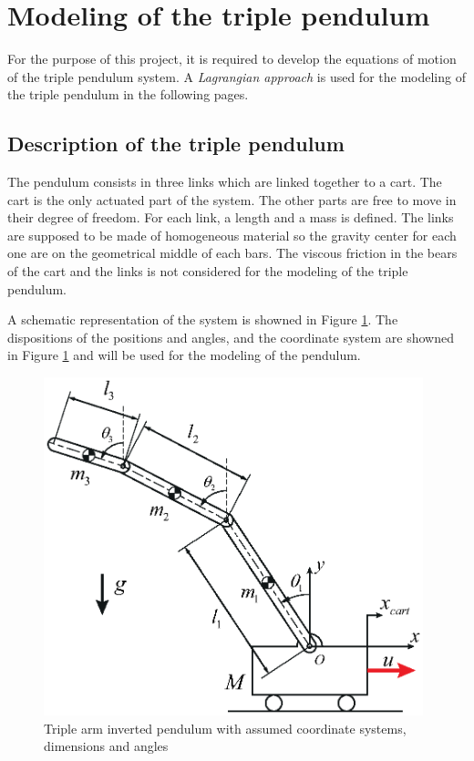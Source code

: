 \documentclass[a4paper,12pt,twoside]{article}
\begin{document}
\section{Modeling of the triple pendulum}
For the purpose of this project, it is required to develop the equations of motion of the triple pendulum system. A \emph{Lagrangian approach} is used for the modeling of the triple pendulum in the following pages.

\subsection{Description of the triple pendulum}
The pendulum consists in three links which are linked together to a cart. The cart is the only actuated part of the system. The other parts are free to move in their degree of freedom. For each link, a length and a mass is defined. The links are supposed to be made of homogeneous material so the gravity center for each one are on the geometrical middle of each bars. The viscous friction in the bears of the cart and the links is not considered for the modeling of the triple pendulum.

A schematic representation of the system is showned in Figure \ref{fig:schematic_system}. The dispositions of the positions and angles, and the coordinate system are showned in Figure \ref{fig:schematic_system} and will be used for the modeling of the pendulum. 
\begin{figure}[ht]
	\centering
	\includegraphics[width=11cm]{illustrations/schematic_system.eps}
	\caption{Triple arm inverted pendulum with assumed coordinate systems, dimensions and angles}
	\label{fig:schematic_system}
\end{figure}
\end{document}
